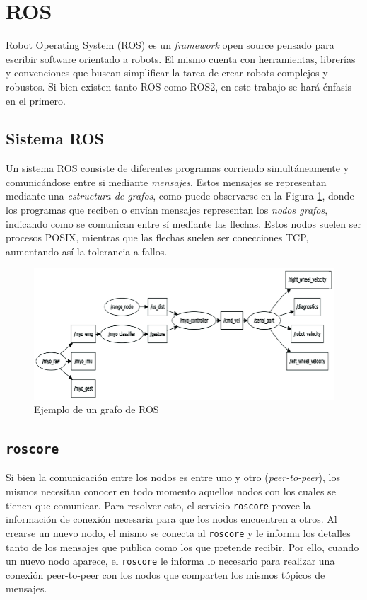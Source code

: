\section{ROS}

Robot Operating System (ROS) es un \textit{framework} open source pensado para escribir software orientado a robots. El mismo cuenta con herramientas, librerías y convenciones que buscan simplificar la tarea de crear robots complejos y robustos. Si bien existen tanto ROS como ROS2, en este trabajo se hará énfasis en el primero.

\subsection{Sistema ROS}
Un sistema ROS consiste de diferentes programas corriendo simultáneamente y comunicándose entre si mediante \textit{mensajes}. Estos mensajes se representan mediante una \textit{estructura de grafos}, como puede observarse en la Figura \ref{fig:rosgraph}, donde los programas que reciben o envían mensajes representan los \textit{nodos grafos}, indicando como se comunican entre sí mediante las flechas. Estos nodos suelen ser procesos POSIX, mientras que las flechas suelen ser conecciones TCP, aumentando así la tolerancia a fallos.

\begin{figure}[!ht]
    \centering
    \includegraphics[width=\textwidth]{Img/ROSGraph.png}
    \caption{Ejemplo de un grafo de ROS}
    \label{fig:rosgraph}
\end{figure}

\subsection{\texttt{roscore}}
Si bien la comunicación entre los nodos es entre uno y otro (\textit{peer-to-peer}), los mismos necesitan conocer en todo momento aquellos nodos con los cuales se tienen que comunicar. Para resolver esto, el servicio \texttt{roscore} provee la información de conexión necesaria para que los nodos encuentren a otros. Al crearse un nuevo nodo, el mismo se conecta al \texttt{roscore} y le informa los detalles tanto de los mensajes que publica como los que pretende recibir. Por ello, cuando un nuevo nodo aparece, el \texttt{roscore} le informa lo necesario para realizar una conexión peer-to-peer con los nodos que comparten los mismos tópicos de mensajes.


